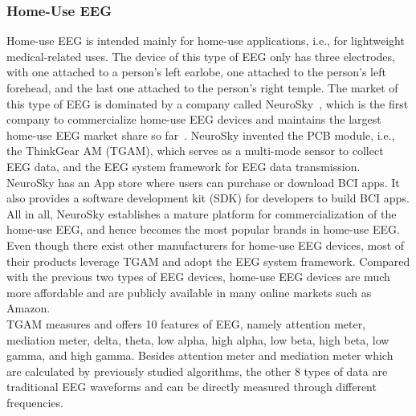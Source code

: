 \subsubsection{Home-Use EEG}
Home-use EEG is intended mainly for home-use applications, i.e., for lightweight medical-related uses. The device of this type of EEG only has three electrodes, with one attached to a person's left earlobe, one attached to the person's left forehead, and the last one attached to the person's right temple. %
The market of this type of EEG is dominated by a company called NeuroSky~\cite{NeuroSky}, which is the first company to commercialize home-use EEG devices and maintains the largest home-use EEG market share so far~\cite{firsthomeeeg,neuroskymarket}. NeuroSky invented the PCB module, i.e., the ThinkGear AM (TGAM), which serves as a multi-mode sensor to collect EEG data, and the  EEG system framework for EEG data transmission. NeuroSky has an App store where users can purchase or download BCI apps. It also provides a software development kit (SDK) for developers to build BCI apps. All in all, NeuroSky establishes a mature platform for commercialization of the home-use EEG, and hence becomes the most popular brands in home-use EEG. Even though there exist other manufacturers for home-use EEG devices, most of their products leverage TGAM and adopt the EEG system framework. Compared with the previous two types of EEG devices, home-use EEG devices are much more affordable and are publicly available in many online markets such as Amazon. \\
\indent TGAM measures and offers 10 features of EEG, namely attention meter, mediation meter, delta, theta, low alpha, high alpha, low beta, high beta, low gamma, and high gamma. Besides attention meter and mediation meter which are calculated by previously studied algorithms, the other 8 types of data are traditional EEG waveforms and can be directly measured through different frequencies.
%
